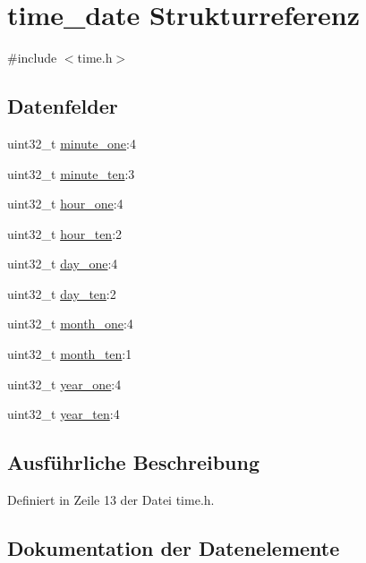 \hypertarget{structtime__date}{}\section{time\+\_\+date Strukturreferenz}
\label{structtime__date}


{\ttfamily \#include $<$time.\+h$>$}

\subsection*{Datenfelder}
\begin{DoxyCompactItemize}
\item 
uint32\+\_\+t \hyperlink{structtime__date_aeb047e7931fb6cd6e4c751d8143c16a4}{minute\+\_\+one}\+:4
\item 
uint32\+\_\+t \hyperlink{structtime__date_a2659c12e8307db4c98ce9cb1bf53bc0e}{minute\+\_\+ten}\+:3
\item 
uint32\+\_\+t \hyperlink{structtime__date_a338fe5a5db873c63189f9c98bf0376fc}{hour\+\_\+one}\+:4
\item 
uint32\+\_\+t \hyperlink{structtime__date_a7315167bc0969310bcaedee5699243e5}{hour\+\_\+ten}\+:2
\item 
uint32\+\_\+t \hyperlink{structtime__date_aa49ac5f823611c03f3c3723f12047cfc}{day\+\_\+one}\+:4
\item 
uint32\+\_\+t \hyperlink{structtime__date_af252ce7a893acb93c32d07d0330f900d}{day\+\_\+ten}\+:2
\item 
uint32\+\_\+t \hyperlink{structtime__date_a6ad3129035cd14cf22da6e4a1fecf018}{month\+\_\+one}\+:4
\item 
uint32\+\_\+t \hyperlink{structtime__date_afadd8a2137e5a4d272d63e02386c2bd8}{month\+\_\+ten}\+:1
\item 
uint32\+\_\+t \hyperlink{structtime__date_a55217c761921c4b4443fb1d4dee3f564}{year\+\_\+one}\+:4
\item 
uint32\+\_\+t \hyperlink{structtime__date_a124f7250b4c2e15669a832132940840d}{year\+\_\+ten}\+:4
\end{DoxyCompactItemize}


\subsection{Ausführliche Beschreibung}


Definiert in Zeile 13 der Datei time.\+h.



\subsection{Dokumentation der Datenelemente}
\hypertarget{structtime__date_aa49ac5f823611c03f3c3723f12047cfc}{}
